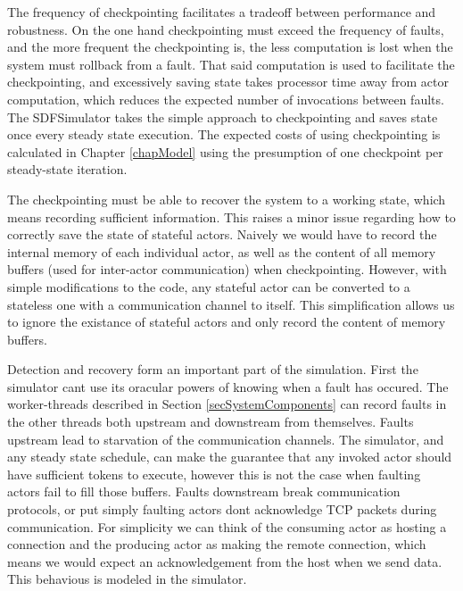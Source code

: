 The frequency of checkpointing facilitates a tradeoff between performance and robustness.
On the one hand checkpointing must exceed the frequency of faults, and the more frequent the checkpointing is, the less computation is lost when the system must rollback from a fault.
That said computation is used to facilitate the checkpointing, and excessively saving state takes processor time away from actor computation, which reduces the expected number of invocations between faults.
The SDFSimulator takes the simple approach to checkpointing and saves state once every steady state execution.
The expected costs of using checkpointing is calculated in Chapter \ref{chapModel} using the presumption of one checkpoint per steady-state iteration.

The checkpointing must be able to recover the system to a working state, which means recording sufficient information.
This raises a minor issue regarding how to correctly save the state of stateful actors.
Naively we would have to record the internal memory of each individual actor, as well as the content of all memory buffers (used for inter-actor communication) when checkpointing.
However, with simple modifications to the code, any stateful actor can be converted to a stateless one with a communication channel to itself.
This simplification allows us to ignore the existance of stateful actors and only record the content of memory buffers.

Detection and recovery form an important part of the simulation.
First the simulator cant use its oracular powers of knowing when a fault has occured.
The worker-threads described in Section \ref{secSystemComponents} can record faults in the other threads both upstream and downstream from themselves.
Faults upstream lead to starvation of the communication channels.
The simulator, and any steady state schedule, can make the guarantee that any invoked actor should have sufficient tokens to execute, however this is not the case when faulting actors fail to fill those buffers.
Faults downstream break communication protocols, or put simply faulting actors dont acknowledge TCP packets during communication.
For simplicity we can think of the consuming actor as hosting a connection and the producing actor as making the remote connection, which means we would expect an acknowledgement from the host when we send data.
This behavious is modeled in the simulator.

